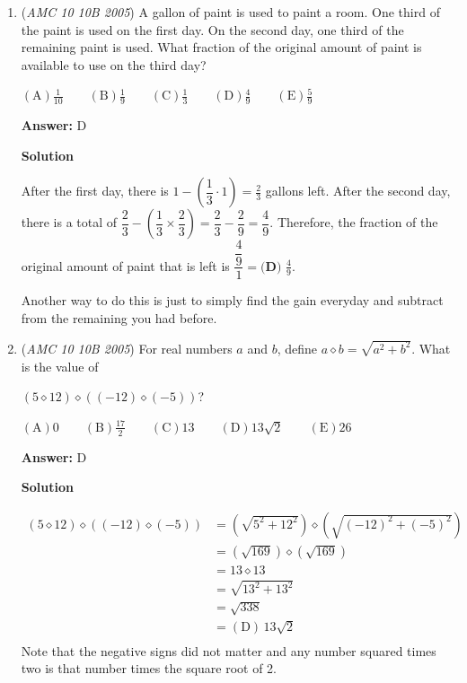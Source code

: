 \begin{enumerate}
\textbf{Solution 2}

Try the answer choices one by one. Upon examination, it is quite obvious that the answer is $\boxed{\textbf{(D) }20}.$ Very fast.

 
Solution by franzliszt

 


	\item (\textit{AMC 10 10B 2005}) A gallon of paint is used to paint a room. One third of the paint is used on the first day. On the second day, one third of the remaining paint is used. What fraction of the original amount of paint is available to use on the third day?


 $\mathrm{(A)} \frac{1}{10} \qquad \mathrm{(B)} \frac{1}{9} \qquad \mathrm{(C)} \frac{1}{3} \qquad \mathrm{(D)} \frac{4}{9} \qquad \mathrm{(E)} \frac{5}{9}$

 \textbf{Answer: }D



\textbf{Solution}

After the first day, there is $1-\left(\dfrac{1}{3}\cdot1\right)=\frac{2}{3}$ gallons left. After the second day, there is a total of $\dfrac{2}{3}-\left(\dfrac{1}{3}\times\dfrac{2}{3}\right)=\dfrac{2}{3}-\dfrac{2}{9}=\dfrac{4}{9}$. Therefore, the fraction of the original amount of paint that is left is $\dfrac{\dfrac{4}{9}}{1}=\boxed{\textbf{(D) }\frac{4}{9}}$.

 Another way to do this is just to simply find the gain everyday and subtract from the remaining you had before.

 


	\item (\textit{AMC 10 10B 2005}) For real numbers $a$ and $b$, define $a \diamond b = \sqrt{a^2 + b^2}$. What is the value of


 $(5 \diamond 12) \diamond ((-12) \diamond (-5))$?


 $\mathrm{(A)} 0 \qquad \mathrm{(B)} \frac{17}{2} \qquad \mathrm{(C)} 13 \qquad \mathrm{(D)} 13\sqrt{2} \qquad \mathrm{(E)} 26$

 \textbf{Answer: }D



\textbf{Solution}


 \begin{align*} (5 \diamond 12) \diamond ((-12) \diamond (-5))&=(\sqrt{5^2+12^2}) \diamond (\sqrt{(-12)^2+(-5)^2})\\ &=(\sqrt{169})\diamond(\sqrt{169})\\ &=13\diamond13\\  &=\sqrt{13^2+13^2}\\  &=\sqrt{338}\\  &=\boxed{\mathrm{(D)\,13\sqrt{2}}}\\ \end{align*}
Note that the negative signs did not matter and any number squared times two is that number times the square root of 2.


\end{enumerate}
